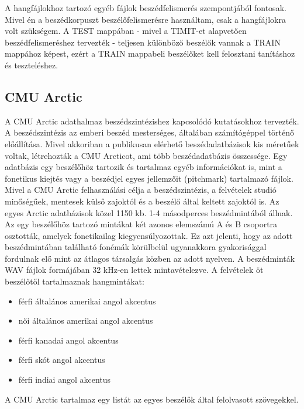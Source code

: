 A hangfájlokhoz tartozó egyéb fájlok beszédfelismerés szempontjából fontosak. Mivel én a beszédkorpuszt beszélőfelismerésre használtam, csak a hangfájlokra volt szükségem. A TEST mappában - mivel a TIMIT-et alapvetően beszédfelismeréshez tervezték - teljesen különböző beszélők vannak a TRAIN mappához képest, ezért a TRAIN mappabeli beszélőket kell felosztani tanításhoz és teszteléshez.

\subsection{CMU Arctic}

A CMU Arctic adathalmaz beszédszintézishez kapcsolódó kutatásokhoz tervezték. A beszédszintézis az emberi beszéd mesterséges, általában számítógéppel történő előállítása. Mivel akkoriban a publikusan elérhető beszédadatbázisok kis méretűek voltak, létrehozták a CMU Arcticot, ami több beszédadatbázis összessége. Egy adatbázis egy beszélőhöz tartozik és tartalmaz egyéb információkat is, mint a fonetikus kiejtés vagy a beszédjel egyes jellemzőit (pitchmark) tartalmazó fájlok.
\newline
\newline
Mivel a CMU Arctic felhasználási célja a beszédszintézis, a felvételek studió minőségűek, mentesek külső zajoktól és a beszélő által keltett zajoktól is.
\newline
\newline
Az egyes Arctic adatbázisok közel 1150 kb. 1-4 másodperces beszédmintából állnak. Az egy beszélőhöz tartozó mintákat két azonos elemszámú A és B csoportra osztották, amelyek fonetikailag kiegyensúlyozottak. Ez azt jelenti, hogy az adott beszédmintában található fonémák körülbelül ugyanakkora gyakorisággal fordulnak elő mint az átlagos társalgás közben az adott nyelven.
A beszédminták WAV fájlok formájában 32 kHz-en lettek mintavételezve. A felvételek öt beszélőtől tartalmaznak hangmintákat:
\newline
\begin{itemize}
	\item férfi általános amerikai angol akcentus
	\item női általános amerikai angol akcentus
	\item férfi kanadai angol akcentus
	\item férfi skót angol akcentus
	\item férfi indiai angol akcentus
\end{itemize}
\bigskip
A CMU Arctic tartalmaz egy listát az egyes beszélők által felolvasott szövegekkel.
